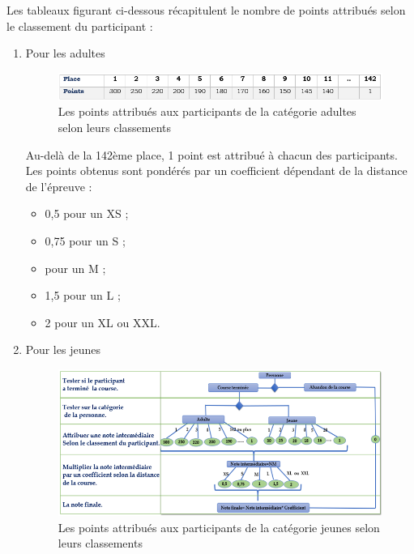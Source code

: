 	Les tableaux figurant ci-dessous récapitulent le nombre de points attribués selon le classement du participant :
	\begin{enumerate}
	   \item Pour les adultes
	\begin{figure}[h!]
	   \center
	   \includegraphics[scale=1]{img/points_categorie_adultes.png}
	   \caption {Les points attribués aux participants de la catégorie adultes selon leurs classements}
	\end{figure}
	
	Au-delà de la 142ème place, 1 point est attribué à chacun des participants. Les points obtenus sont pondérés par un coefficient dépendant de la distance de l’épreuve : 
	
	\begin{itemize} 
	 	\item 0,5 pour un XS ; 
	 	\item 0,75 pour un S ;
	 	\item  pour un M ; 
	 	\item 1,5 pour un L ;
	 	\item 2 pour un XL ou XXL.
	\end{itemize} 
	   \item Pour les jeunes
	\begin{figure}[!h]
	   \center
	   \includegraphics[scale=0.9]{img/points_categorie_jeunes.png}
	   \caption {Les points attribués aux participants de la catégorie jeunes selon leurs classements}
	\end{figure}
	
	\end{enumerate}

